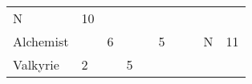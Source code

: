 \documentclass[12pt]{article}
\begin{document}
\begin{longtable}[]{@{}llllllllll@{}}
\begin{minipage}[t]{0.07\columnwidth}
N
\strut\end{minipage} &
\begin{minipage}[t]{0.08\columnwidth}\raggedright\strut
10
\strut\end{minipage}\tabularnewline
\begin{minipage}[t]{0.13\columnwidth}\raggedright\strut
Alchemist
\strut\end{minipage} &
\begin{minipage}[t]{0.06\columnwidth}\raggedright\strut
\strut\end{minipage} &
\begin{minipage}[t]{0.06\columnwidth}\raggedright\strut
6
\strut\end{minipage} &
\begin{minipage}[t]{0.06\columnwidth}\raggedright\strut
\strut\end{minipage} &
\begin{minipage}[t]{0.06\columnwidth}\raggedright\strut
\strut\end{minipage} &
\begin{minipage}[t]{0.06\columnwidth}\raggedright\strut
5
\strut\end{minipage} &
\begin{minipage}[t]{0.06\columnwidth}\raggedright\strut
\strut\end{minipage} &
\begin{minipage}[t]{0.06\columnwidth}\raggedright\strut
\strut\end{minipage} &
\begin{minipage}[t]{0.07\columnwidth}\raggedright\strut
N
\strut\end{minipage} &
\begin{minipage}[t]{0.08\columnwidth}\raggedright\strut
11
\strut\end{minipage}\tabularnewline
\begin{minipage}[t]{0.13\columnwidth}\raggedright\strut
Valkyrie
\strut\end{minipage} &
\begin{minipage}[t]{0.06\columnwidth}\raggedright\strut
2
\strut\end{minipage} &
\begin{minipage}[t]{0.06\columnwidth}\raggedright\strut
\strut\end{minipage} &
\begin{minipage}[t]{0.06\columnwidth}\raggedright\strut
5
\strut\end{minipage} &
\begin{minipage}[t]{0.06\columnwidth}\raggedright\strut

\end{minipage}
\end{longtable}
\end{document}

